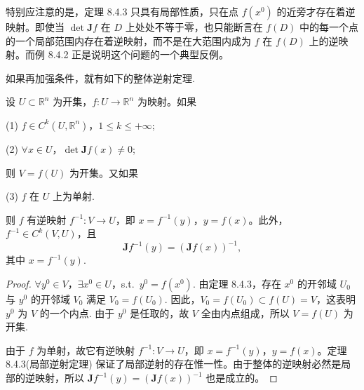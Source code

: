\noindent 特别应注意的是，定理 8.4.3 只具有局部性质，只在点 $f(x^{0})$ 的近旁才存在着逆映射。即使当 $\det \boldsymbol{J}f$ 在 $D$ 上处处不等于零，也只能断言在 $f(D)$ 中的每一个点的一个局部范围内存在着逆映射，而不是在大范围内成为 $f$ 在 $f(D)$ 上的逆映射。而例 8.4.2 正是说明这个问题的一个典型反例。

如果再加强条件，就有如下的整体逆射定理.

\begin{theorem}[整体逆射定理]\label{thm:8.4.4}
设 $U \subset \mathbb{R}^{n}$ 为开集，$f: U \to \mathbb{R}^{n}$ 为映射。如果

(1) $f \in C^{k}(U,\mathbb{R}^{n})$，$1 \leqslant k \leqslant +\infty$;

(2) $\forall x \in U$，$\det \boldsymbol{J}f(x) \neq 0$;

则 $V = f(U)$ 为开集。又如果

(3) $f$ 在 $U$ 上为单射.

则 $f$ 有逆映射 $f^{-1}: V \to U$，即 $x = f^{-1}(y)$，$y = f(x)$。此外，$f^{-1} \in C^{k}(V,U)$，且
\[
  \boldsymbol{J}f^{-1}(y) = \left(\boldsymbol{J}f(x)\right)^{-1},
\]
其中 $x = f^{-1}(y)$.
\end{theorem}

\begin{proof}
$\forall y^{0} \in V$，$\exists x^{0} \in U$，s.t.\ $y^{0} = f(x^{0})$. 由定理 8.4.3，存在 $x^{0}$ 的开邻域 $U_{0}$ 与 $y^{0}$ 的开邻域 $V_{0}$ 满足 $V_{0} = f(U_{0})$. 因此，$V_{0} = f(U_{0}) \subset f(U) = V$，这表明 $y^{0}$ 为 $V$ 的一个内点. 由于 $y^{0}$ 是任取的，故 $V$ 全由内点组成，所以 $V = f(U)$ 为开集.

由于 $f$ 为单射，故它有逆映射 $f^{-1}: V \to U$，即 $x = f^{-1}(y)$，$y = f(x)$。定理 8.4.3(局部逆射定理) 保证了局部逆射的存在惟一性。由于整体的逆映射必然是局部的逆映射，所以 $\boldsymbol{J}f^{-1}(y) = \left(\boldsymbol{J}f(x)\right)^{-1}$ 也是成立的。
\end{proof}

